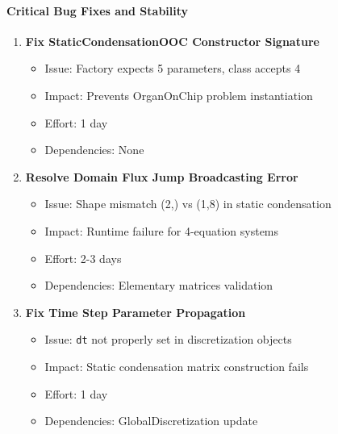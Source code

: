 \paragraph{Critical Bug Fixes and Stability}
\begin{enumerate}
    \item \textbf{Fix StaticCondensationOOC Constructor Signature}
    \begin{itemize}
        \item Issue: Factory expects 5 parameters, class accepts 4
        \item Impact: Prevents OrganOnChip problem instantiation
        \item Effort: 1 day
        \item Dependencies: None
    \end{itemize}
    
    \item \textbf{Resolve Domain Flux Jump Broadcasting Error}
    \begin{itemize}
        \item Issue: Shape mismatch (2,) vs (1,8) in static condensation
        \item Impact: Runtime failure for 4-equation systems
        \item Effort: 2-3 days
        \item Dependencies: Elementary matrices validation
    \end{itemize}
    
    \item \textbf{Fix Time Step Parameter Propagation}
    \begin{itemize}
        \item Issue: \texttt{dt} not properly set in discretization objects
        \item Impact: Static condensation matrix construction fails
        \item Effort: 1 day
        \item Dependencies: GlobalDiscretization update
    \end{itemize}
\end{enumerate}

